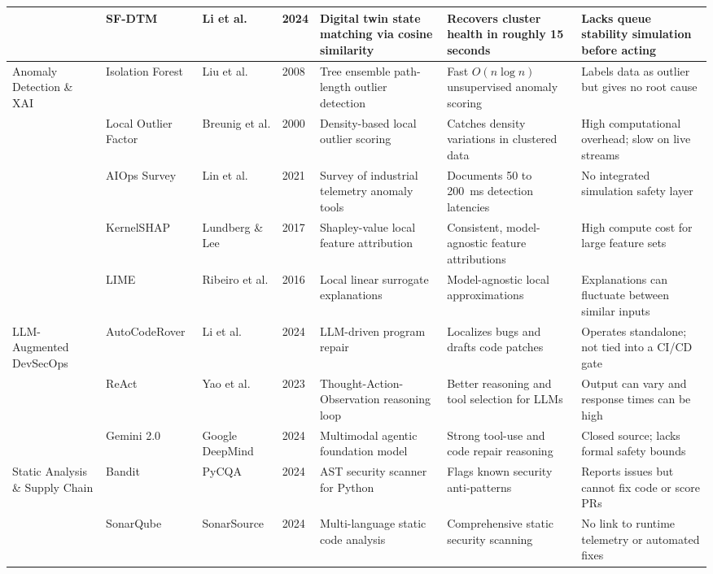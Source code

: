 \documentclass[10pt,conference]{IEEEtran}
\begin{document}
\begin{table}[!t]
\begin{tabular}{@{}p{1.6cm}p{1.8cm}p{1.8cm}p{0.5cm}p{3.0cm}p{3.2cm}p{3.5cm}@{}}
 & SF-DTM & Li et al. \cite{sfdtm} & 2024 & Digital twin state matching via cosine similarity & Recovers cluster health in roughly 15 seconds & Lacks queue stability simulation before acting \\
\midrule
\multirow{4}{1.6cm}{Anomaly Detection \& XAI} & Isolation Forest & Liu et al. \cite{isolationforest} & 2008 & Tree ensemble path-length outlier detection & Fast $O(n \log n)$ unsupervised anomaly scoring & Labels data as outlier but gives no root cause \\
 & Local Outlier Factor & Breunig et al. \cite{lof} & 2000 & Density-based local outlier scoring & Catches density variations in clustered data & High computational overhead; slow on live streams \\
 & AIOps Survey & Lin et al. \cite{aiops} & 2021 & Survey of industrial telemetry anomaly tools & Documents 50 to 200~ms detection latencies & No integrated simulation safety layer \\
 & KernelSHAP & Lundberg \& Lee \cite{kernelshap} & 2017 & Shapley-value local feature attribution & Consistent, model-agnostic feature attributions & High compute cost for large feature sets \\
 & LIME & Ribeiro et al. \cite{lime} & 2016 & Local linear surrogate explanations & Model-agnostic local approximations & Explanations can fluctuate between similar inputs \\
\midrule
\multirow{3}{1.6cm}{LLM-Augmented DevSecOps} & AutoCodeRover & Li et al. \cite{autocoderover} & 2024 & LLM-driven program repair & Localizes bugs and drafts code patches & Operates standalone; not tied into a CI/CD gate \\
 & ReAct & Yao et al. \cite{react} & 2023 & Thought-Action-Observation reasoning loop & Better reasoning and tool selection for LLMs & Output can vary and response times can be high \\
 & Gemini 2.0 & Google DeepMind \cite{gemini2} & 2024 & Multimodal agentic foundation model & Strong tool-use and code repair reasoning & Closed source; lacks formal safety bounds \\
\midrule
\multirow{8}{1.6cm}{Static Analysis \& Supply Chain} & Bandit & PyCQA \cite{bandit} & 2024 & AST security scanner for Python & Flags known security anti-patterns & Reports issues but cannot fix code or score PRs \\
 & SonarQube & SonarSource \cite{sonarqube} & 2024 & Multi-language static code analysis & Comprehensive static security scanning & No link to runtime telemetry or automated fixes \\

\end{tabular}
\end{table}
\end{document}

